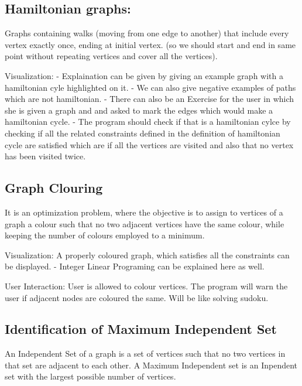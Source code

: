 \hypertarget{hamiltonian-graphs}{%
\subsection{Hamiltonian graphs:}\label{hamiltonian-graphs}}

Graphs containing walks (moving from one edge to another) that include
every vertex exactly once, ending at initial vertex. (so we should start
and end in same point without repeating vertices and cover all the
vertices).

Visualization: - Explaination can be given by giving an example graph
with a hamiltonian cyle highlighted on it. - We can also give negative
examples of paths which are not hamiltonian. - There can also be an
Exercise for the user in which she is given a graph and and asked to
mark the edges which would make a hamiltonian cycle. - The program
should check if that is a hamiltonian cylce by checking if all the
related constraints defined in the definition of hamiltonian cycle are
satisfied which are if all the vertices are visited and also that no
vertex has been visited twice.

\hypertarget{graph-clouring}{%
\subsection{Graph Clouring}\label{graph-clouring}}

It is an optimization problem, where the objective is to assign to
vertices of a graph a colour such that no two adjacent vertices have the
same colour, while keeping the number of colours employed to a minimum.


Visualization: A properly coloured graph, which satisfies all the
constraints can be displayed. - Integer Linear Programing can be
explained here as well.


User Interaction: User is allowed to colour vertices. The program
will warn the user if adjacent nodes are coloured the same. Will be
like solving sudoku.

\hypertarget{identification-of-maximum-independent-set}{%
\subsection{Identification of Maximum Independent
Set}\label{identification-of-maximum-independent-set}}

An Independent Set of a graph is a set of vertices such that no two
vertices in that set are adjacent to each other. A Maximum Independent
set is an Inpendent set with the largest possible number of vertices.

